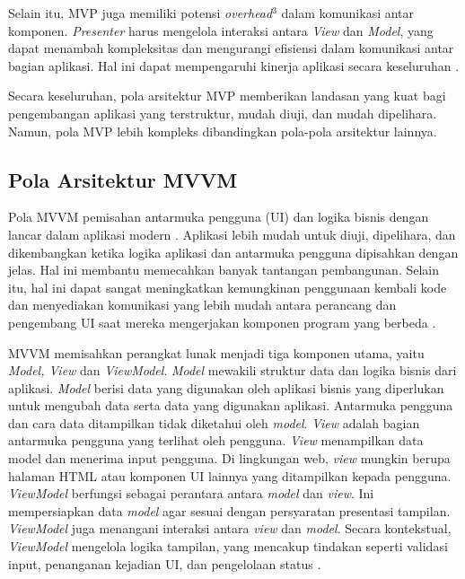 \documentclass[conference]{IEEEtran}
\begin{document}
    Selain itu, MVP juga memiliki potensi  \textit{overhead}$^3$ dalam komunikasi antar komponen. \textit{Presenter} harus mengelola interaksi antara  \textit{View} dan \textit{Model}, yang dapat menambah kompleksitas dan mengurangi efisiensi dalam komunikasi antar bagian aplikasi. Hal ini dapat mempengaruhi kinerja aplikasi secara keseluruhan \cite{brp2020}.

    Secara keseluruhan, pola arsitektur MVP memberikan landasan yang kuat bagi pengembangan aplikasi yang terstruktur, mudah diuji, dan mudah dipelihara. Namun, pola MVP lebih kompleks dibandingkan pola-pola arsitektur lainnya.

    \thispagestyle{secondpagestyle}
 
	\subsection{Pola Arsitektur MVVM}
	Pola MVVM pemisahan antarmuka pengguna (UI) dan logika bisnis dengan lancar dalam aplikasi modern \cite{Kom2022,Car2022}. Aplikasi lebih mudah untuk diuji, dipelihara, dan dikembangkan ketika logika aplikasi dan antarmuka pengguna dipisahkan dengan jelas. Hal ini membantu memecahkan banyak tantangan pembangunan. Selain itu, hal ini dapat sangat meningkatkan kemungkinan penggunaan kembali kode dan menyediakan komunikasi yang lebih mudah antara perancang dan pengembang UI saat mereka mengerjakan komponen program yang berbeda \cite{michael2023}. 
	
	MVVM memisahkan perangkat lunak menjadi tiga komponen utama, yaitu \textit{Model, View} dan \textit{ViewModel}. \textit{Model} mewakili struktur data dan logika bisnis dari aplikasi. \textit{Model} berisi data yang digunakan oleh aplikasi bisnis yang diperlukan untuk mengubah data serta data yang digunakan aplikasi. Antarmuka pengguna dan cara data ditampilkan tidak diketahui oleh \textit{model}.
	\textit{View} adalah bagian antarmuka pengguna yang terlihat oleh pengguna. \textit{View} menampilkan data model dan menerima input pengguna. Di lingkungan web, \textit{view} mungkin berupa halaman HTML atau komponen UI lainnya yang ditampilkan kepada pengguna.
	\textit{ViewModel} berfungsi sebagai perantara antara \textit{model} dan \textit{view}. Ini mempersiapkan data \textit{model} agar sesuai dengan persyaratan presentasi tampilan. \textit{ViewModel} juga menangani interaksi antara \textit{view} dan \textit{model}. Secara kontekstual, \textit{ViewModel} mengelola logika tampilan, yang mencakup tindakan seperti validasi input, penanganan kejadian UI, dan pengelolaan status \cite{Martin2024}.
\end{document}
